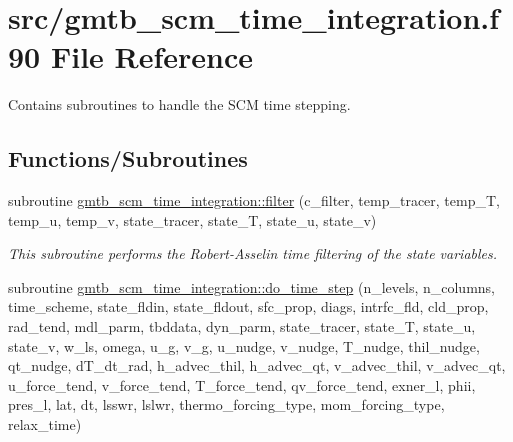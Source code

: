 \hypertarget{gmtb__scm__time__integration_8f90}{}\section{src/gmtb\+\_\+scm\+\_\+time\+\_\+integration.f90 File Reference}
\label{gmtb__scm__time__integration_8f90}


Contains subroutines to handle the S\+CM time stepping.  


\subsection*{Functions/\+Subroutines}
{\bf }\par
\begin{DoxyCompactItemize}
\item 
subroutine \hyperlink{group__time__integration_gadc22247097920b209bb2c62f4dfe8f75}{gmtb\+\_\+scm\+\_\+time\+\_\+integration\+::filter} (c\+\_\+filter, temp\+\_\+tracer, temp\+\_\+T, temp\+\_\+u, temp\+\_\+v, state\+\_\+tracer, state\+\_\+T, state\+\_\+u, state\+\_\+v)
\begin{DoxyCompactList}\small\item\em This subroutine performs the Robert-\/\+Asselin time filtering of the state variables. \end{DoxyCompactList}\item 
subroutine \hyperlink{group__time__integration_ga32b72716e3e970874e9cb909ba66328d}{gmtb\+\_\+scm\+\_\+time\+\_\+integration\+::do\+\_\+time\+\_\+step} (n\+\_\+levels, n\+\_\+columns, time\+\_\+scheme, state\+\_\+fldin, state\+\_\+fldout, sfc\+\_\+prop, diags, intrfc\+\_\+fld, cld\+\_\+prop,   rad\+\_\+tend, mdl\+\_\+parm, tbddata, dyn\+\_\+parm, state\+\_\+tracer, state\+\_\+T, state\+\_\+u, state\+\_\+v, w\+\_\+ls, omega, u\+\_\+g, v\+\_\+g, u\+\_\+nudge, v\+\_\+nudge, T\+\_\+nudge, thil\+\_\+nudge, qt\+\_\+nudge, d\+T\+\_\+dt\+\_\+rad, h\+\_\+advec\+\_\+thil, h\+\_\+advec\+\_\+qt, v\+\_\+advec\+\_\+thil, v\+\_\+advec\+\_\+qt, u\+\_\+force\+\_\+tend, v\+\_\+force\+\_\+tend, T\+\_\+force\+\_\+tend,   qv\+\_\+force\+\_\+tend, exner\+\_\+l, phii, pres\+\_\+l, lat, dt, lsswr, lslwr, thermo\+\_\+forcing\+\_\+type, mom\+\_\+forcing\+\_\+type, relax\+\_\+time)

\end{DoxyCompactItemize}
